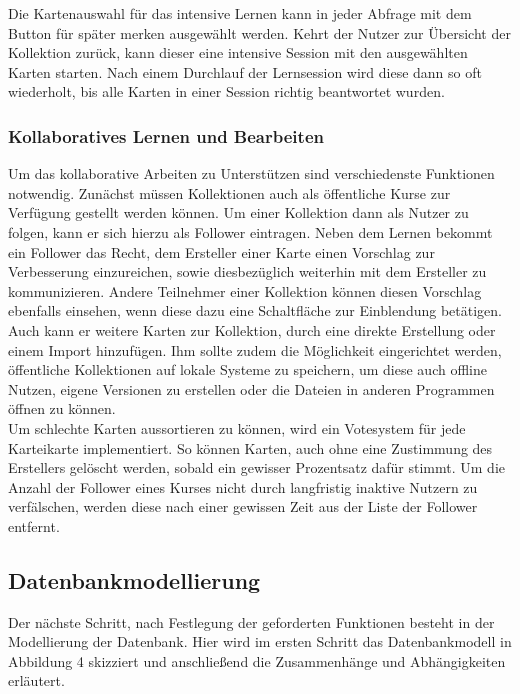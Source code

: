 Die Kartenauswahl für das intensive Lernen kann in jeder Abfrage mit dem Button \glqq für später merken\grqq{} ausgewählt werden. Kehrt der Nutzer zur Übersicht der Kollektion zurück, kann dieser eine intensive Session mit den ausgewählten Karten starten. Nach einem Durchlauf der Lernsession wird diese dann so oft wiederholt, bis alle Karten in einer Session richtig beantwortet wurden.


\subsubsection{Kollaboratives Lernen und Bearbeiten}
Um das kollaborative Arbeiten zu Unterstützen sind verschiedenste Funktionen notwendig. Zunächst müssen Kollektionen auch als öffentliche Kurse zur Verfügung gestellt werden können. Um einer Kollektion dann als Nutzer zu folgen, kann er sich hierzu als Follower eintragen. Neben dem Lernen bekommt ein Follower das Recht, dem Ersteller einer Karte einen Vorschlag zur Verbesserung einzureichen, sowie diesbezüglich weiterhin mit dem Ersteller zu kommunizieren. Andere Teilnehmer einer Kollektion können diesen Vorschlag ebenfalls einsehen, wenn diese dazu eine Schaltfläche zur Einblendung betätigen. Auch kann er weitere Karten zur Kollektion, durch eine direkte Erstellung oder einem Import hinzufügen. Ihm sollte zudem die Möglichkeit eingerichtet werden, öffentliche Kollektionen auf lokale Systeme zu speichern, um diese auch offline Nutzen, eigene Versionen zu erstellen oder die Dateien in anderen Programmen öffnen zu können. \\

Um schlechte Karten aussortieren zu können, wird ein Votesystem für jede Karteikarte implementiert. So können Karten, auch ohne eine Zustimmung des Erstellers gelöscht werden, sobald ein gewisser Prozentsatz dafür stimmt. Um die Anzahl der Follower eines Kurses nicht durch langfristig inaktive Nutzern zu verfälschen, werden diese nach einer gewissen Zeit aus der Liste der Follower entfernt. 

\subsection{Datenbankmodellierung}
Der nächste Schritt, nach Festlegung der geforderten Funktionen besteht in der Modellierung der Datenbank. Hier wird im ersten Schritt das Datenbankmodell in Abbildung 4 skizziert und anschließend die Zusammenhänge und Abhängigkeiten erläutert.  

